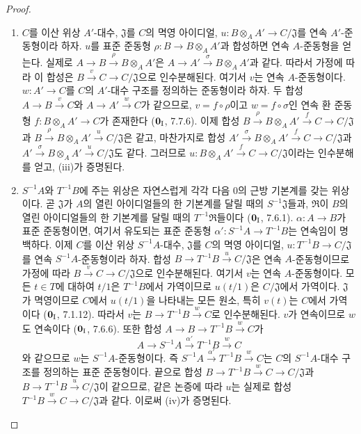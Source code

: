 \begin{proof}
\begin{enumerate}
  \item[(iii)] $C$를 이산 위상 $A'$-대수, $\mathfrak J$를 $C$의 멱영
  아이디얼, $u:B\otimes_A A'\to C/\mathfrak J$를 연속
  $A'$-준동형이라 하자. $u$를 표준 준동형
  $\rho:B\to B\otimes_A A'$과 합성하면 연속 $A$-준동형을 얻는다.
  실제로 $A\to B\xrightarrow{\rho}B\otimes_A A'$은
  $A\to A'\xrightarrow{\sigma}B\otimes_A A'$과 같다. 따라서 가정에
  따라 이 합성은 $B\xrightarrow{v}C\to C/\mathfrak J$으로
  인수분해된다. 여기서 $v$는 연속 $A$-준동형이다. $w:A'\to C$를
  $C$의 $A'$-대수 구조를 정의하는 준동형이라 하자. 두 합성
  $A\to B\xrightarrow{v}C$와 $A\to A'\xrightarrow{w}C$가 같으므로,
  $v=f\circ\rho$이고 $w=f\circ\sigma$인 연속 환 준동형
  $f:B\otimes_A A'\to C$가 존재한다
  ($\mathbf 0_{\rm I}$, 7.7.6). 이제 합성
  $B\xrightarrow{\rho}B\otimes_A A'\xrightarrow{f}C\to C/\mathfrak J$과
  $B\xrightarrow{\rho}B\otimes_A A'\xrightarrow{u}C/\mathfrak J$은 같고,
  마찬가지로 합성
  $A'\xrightarrow{\sigma}B\otimes_A A'\xrightarrow{f}C
  \to C/\mathfrak J$과
  $A'\xrightarrow{\sigma}B\otimes_A A'\xrightarrow{u}C/\mathfrak J$도
  같다. 그러므로
  $u:B\otimes_A A'\xrightarrow{f}C\to C/\mathfrak J$이라는 인수분해를
  얻고, (iii)가 증명된다.
  \item[(iv)] $S^{-1}A$와 $T^{-1}B$에 주는 위상은 자연스럽게 각각
  다음 $0$의 근방 기본계를 갖는 위상이다. 곧 $\mathfrak J$가 $A$의
  열린 아이디얼들의 한 기본계를 달릴 때의 $S^{-1}\mathfrak J$들과,
  $\mathfrak R$이 $B$의 열린 아이디얼들의 한 기본계를 달릴 때의
  $T^{-1}\mathfrak R$들이다 ($\mathbf 0_{\rm I}$, 7.6.1).
  $\alpha:A\to B$가 표준 준동형이면, 여기서 유도되는 표준 준동형
  $\alpha':S^{-1}A\to T^{-1}B$는 연속임이 명백하다. 이제 $C$를 이산
  위상 $S^{-1}A$-대수, $\mathfrak J$를 $C$의 멱영 아이디얼,
  $u:T^{-1}B\to C/\mathfrak J$를 연속 $S^{-1}A$-준동형이라 하자.
  합성 $B\to T^{-1}B\xrightarrow{u}C/\mathfrak J$은 연속
  $A$-준동형이므로 가정에 따라
  $B\xrightarrow{v}C\to C/\mathfrak J$으로 인수분해된다. 여기서 $v$는
  연속 $A$-준동형이다. 모든 $t\in T$에 대하여 $t/1$은 $T^{-1}B$에서
  가역이므로 $u(t/1)$은 $C/\mathfrak J$에서 가역이다.
  $\mathfrak J$가 멱영이므로 $C$에서 $u(t/1)$을 나타내는 모든 원소,
  특히 $v(t)$는 $C$에서 가역이다 ($\mathbf 0_{\rm I}$, 7.1.12).
  따라서 $v$는 $B\to T^{-1}B\xrightarrow{w}C$로 인수분해된다. $v$가
  연속이므로 $w$도 연속이다 ($\mathbf 0_{\rm I}$, 7.6.6). 또한 합성
  $A\to B\to T^{-1}B\xrightarrow{w}C$가
  \[
    A\to S^{-1}A\xrightarrow{\alpha'}T^{-1}B\xrightarrow{w}C
  \]
  와 같으므로 $w$는 $S^{-1}A$-준동형이다. 즉
  $S^{-1}A\xrightarrow{\alpha'}T^{-1}B\xrightarrow{w}C$는 $C$의
  $S^{-1}A$-대수 구조를 정의하는 표준 준동형이다. 끝으로 합성
  $B\to T^{-1}B\xrightarrow{w}C\to C/\mathfrak J$과
  $B\to T^{-1}B\xrightarrow{u}C/\mathfrak J$이 같으므로, 같은 논증에
  따라 $u$는 실제로 합성
  $T^{-1}B\xrightarrow{w}C\to C/\mathfrak J$과 같다. 이로써 (iv)가
  증명된다.


\end{enumerate}
\end{proof}
